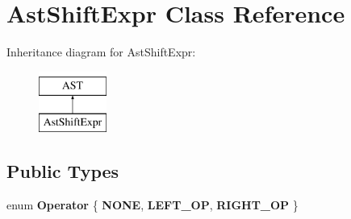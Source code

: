 \hypertarget{classAstShiftExpr}{\section{Ast\-Shift\-Expr Class Reference}
\label{classAstShiftExpr}
}
Inheritance diagram for Ast\-Shift\-Expr\-:\begin{figure}[H]
\begin{center}
\leavevmode
\includegraphics[height=2.000000cm]{classAstShiftExpr}
\end{center}
\end{figure}
\subsection*{Public Types}
\begin{DoxyCompactItemize}
\item 
enum {\bfseries Operator} \{ {\bfseries N\-O\-N\-E}, 
{\bfseries L\-E\-F\-T\-\_\-\-O\-P}, 
{\bfseries R\-I\-G\-H\-T\-\_\-\-O\-P}
 \}
\end{DoxyCompactItemize}
